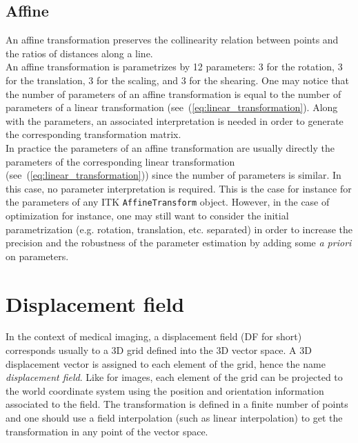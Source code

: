 \subsection{Affine}

An affine transformation preserves the collinearity relation between points and the ratios of distances along a line.
\\
An affine transformation is parametrizes by 12 parameters: 3 for the rotation, 3 for the translation, 3 for the scaling, and 3 for the shearing. One may notice that the number of parameters of an affine transformation is equal to the number of parameters of a linear transformation (see~(\ref{eq:linear_transformation}). Along with the parameters, an associated interpretation is needed in order to generate the corresponding transformation matrix.
\\
In practice the parameters of an affine transformation are usually directly the parameters of the corresponding linear transformation (see~(\ref{eq:linear_transformation})) since the number of parameters is similar. In this case, no parameter interpretation is required. This is the case for instance for the parameters of any ITK \texttt{AffineTransform} object. However, in the case of optimization for instance, one may still want to consider the initial parametrization (e.g. rotation, translation, etc. separated) in order to increase the precision and the robustness of the parameter estimation by adding some \textit{a priori} on parameters.



\section{Displacement field}
\label{sec:transformations:df}


In the context of medical imaging, a displacement field (DF for short) corresponds usually to a 3D grid defined into the 3D vector space. A 3D displacement vector is assigned to each element of the grid, hence the name \textit{displacement field}. Like for images, each element of the grid can be projected to the world coordinate system using the position and orientation information associated to the field. The transformation is defined in a finite number of points and one should use a field interpolation (such as linear interpolation) to get the transformation in any point of the vector space.
\\

